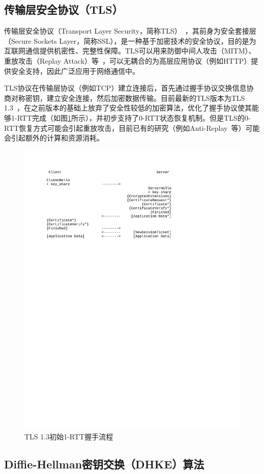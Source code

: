 \subsection{传输层安全协议（TLS）}

传输层安全协议（Transport Layer Security，简称TLS）~\cite{8446}，其前身为安全套接层（Secure Sockets Layer，简称SSL），是一种基于加密技术的安全协议，目的是为互联网通信提供机密性、完整性保障。TLS可以用来防御中间人攻击（MITM）、重放攻击（Replay Attack）等~\cite{8446}，可以无耦合的为高层应用协议（例如HTTP）提供安全支持，因此广泛应用于网络通信中。

TLS协议在传输层协议（例如TCP）建立连接后，首先通过握手协议交换信息协商对称密钥，建立安全连接，然后加密数据传输。目前最新的TLS版本为TLS 1.3~\cite{8446}，在之前版本的基础上放弃了安全性较低的加密算法，优化了握手协议使其能够1-RTT完成（如图\ref{fig:1-rtt}所示），并初步支持了0-RTT状态恢复机制。但是TLS的0-RTT恢复方式可能会引起重放攻击，目前已有的研究（例如Anti-Replay~\cite{8446}等）可能会引起额外的计算和资源消耗。

\begin{figure}[!ht]
    \centering
    \includegraphics[width=.7\textwidth]{figures/1-RTT.svg}
    \caption{TLS 1.3初始1-RTT握手流程}
    \label{fig:1-rtt}
\end{figure}

\subsection{Diffie-Hellman密钥交换（DHKE）算法}

